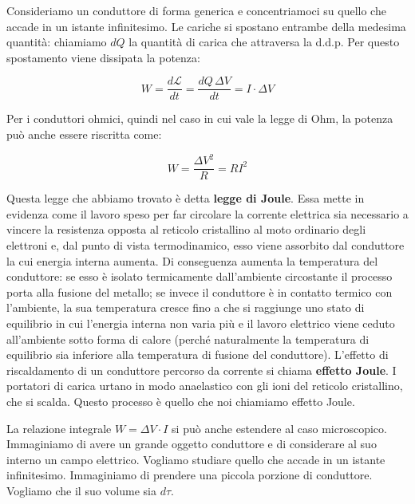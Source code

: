 Consideriamo un conduttore di forma generica e concentriamoci su quello che accade in un istante infinitesimo. Le cariche si spostano entrambe della medesima quantità: chiamiamo $dQ$ la quantità di carica che attraversa la d.d.p. Per questo spostamento viene dissipata la potenza:

\[
	\boxed{W=\frac{d\mathcal{L}}{dt} = \frac{dQ\,\Delta V}{dt} = I\cdot \Delta V}
\]

Per i conduttori ohmici, quindi nel caso in cui vale la legge di Ohm, la potenza può anche essere riscritta come:

\[
	W=\frac{\Delta V^2}{R} = RI^2
\]

Questa legge che abbiamo trovato è detta \textbf{legge di Joule}. Essa mette in evidenza come il lavoro speso per far circolare la corrente elettrica sia necessario a vincere la resistenza opposta al reticolo cristallino al moto ordinario degli elettroni e, dal punto di vista termodinamico, esso viene assorbito dal conduttore la cui energia interna aumenta. Di conseguenza aumenta la temperatura del conduttore: se esso è isolato termicamente dall'ambiente circostante il processo porta alla fusione del metallo; se invece il conduttore è in contatto termico con l'ambiente, la sua temperatura cresce fino a che si raggiunge uno stato di equilibrio in cui l'energia interna non varia più e il lavoro elettrico viene ceduto all'ambiente sotto forma di calore (perché naturalmente la temperatura di equilibrio sia inferiore alla temperatura di fusione del conduttore). L'effetto di riscaldamento di un conduttore percorso da corrente si chiama \textbf{effetto Joule}.
I portatori di carica urtano in modo anaelastico con gli ioni del reticolo cristallino, che si scalda. Questo processo è quello che noi chiamiamo effetto Joule.

La relazione integrale $ W=\Delta V\cdot I $ si può anche estendere al caso microscopico.
Immaginiamo di avere un grande oggetto conduttore e di considerare al suo interno un campo elettrico.
Vogliamo studiare quello che accade in un istante infinitesimo. Immaginiamo di prendere una piccola porzione di conduttore. Vogliamo che il suo volume sia $d\tau$.

